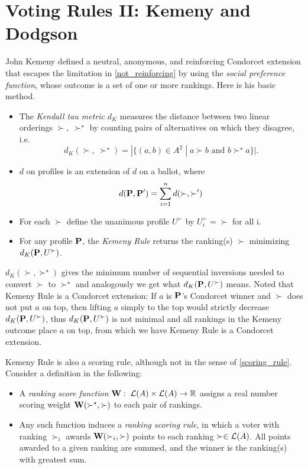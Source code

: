 \section{Voting Rules II: Kemeny and Dodgson}

John Kemeny defined a neutral, anonymous, and reinforcing Condorcet extension that escapes the limitation in \cref{not_reinforcing} by using the \textit{social preference function}, whose outcome is a set of one or more rankings. Here is his basic method.

\begin{definition}
    \begin{itemize}
        \item The \emph{Kendall tau metric} $d_K$ measures the distance between two linear orderings $\succ,\;\succ^\star$ by counting pairs of alternatives on which they disagree, i.e. 
        $$d_K (\succ,\;\succ^\star) = |\{(a,b) \in A^2 \;|\; a \succ b \mbox{ and } b \succ^\star a\}|.$$
        \item $d$ on profiles is an extension of $d$ on a ballot, where
        $$d(\mathbf{P},\mathbf{P}') = \sum_{i = 1}^{n} d (\succ, \succ')$$
        \item For each $\succ$ define the unanimous profile $U^\succ$ by $U^\succ_i = \succ$ for all i.
        \item For any profile $\mathbf{P}$, the \emph{Kemeny Rule} returns the ranking(s) $\succ$ minimizing $d_K(\mathbf{P},U^\succ)$.
    \end{itemize}
\end{definition}

$d_K(\succ,\succ^\star)$ gives the minimum number of sequential inversions needed to convert $\succ$ to $\succ^\star$ and analogously we get what $d_K (\mathbf{P},U^\succ)$ means. Noted that Kemeny Rule is a Condorcet extension: If $a$ is $\mathbf{P}$'s Condorcet winner and $\succ$ does not put $a$ on top, then lifting $a$ simply to the top would strictly decrease $d_K(\mathbf{P},U^\succ)$, thus $d_K(\mathbf{P},U^\succ)$ is not minimal and all rankings in the Kemeny outcome place $a$ on top, from which we have Kemeny Rule is a Condorcet extension.

Kemeny Rule is also a scoring rule, although not in the sense of \cref{scoring_rule}. Consider a definition in the following:

\begin{definition}
    \begin{itemize}
        \item A \emph{ranking score function} $\mathbf{W}:\; \mathcal{L}(A) \times \mathcal{L}(A) \to \mathbb{R}$ assigns a real number scoring weight $\mathbf{W}(\succ^\star, \succ)$ to each pair of rankings.
        \item Any such function induces a \emph{ranking scoring rule}, in which a voter with ranking $\succ_i$ awards $\mathbf{W}(\succ_i, \succ)$ points to each ranking $\succ \in \mathcal{L}(A)$. All points awarded to a given ranking are summed, and the winner is the ranking(s) with greatest sum.
    \end{itemize}
\end{definition}

